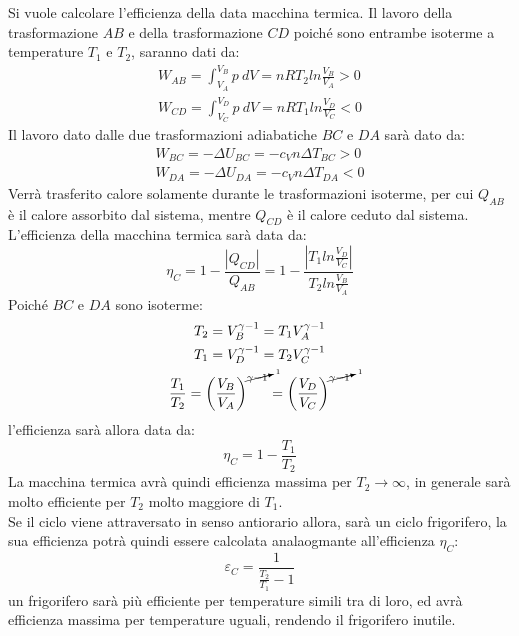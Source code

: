\documentclass{article}
\numberwithin{equation}{subsection}
\begin{document}
Si vuole calcolare l'efficienza della data macchina termica. Il 
lavoro della trasformazione $AB$ e della trasformazione $CD$ poiché sono 
entrambe isoterme a temperature $T_1$ e $T_2$, saranno dati da: 
\begin{gather}
    W_{AB}=\int_{V_A}^{V_B}p\:dV=nRT_2ln\displaystyle\frac{V_B}{V_A}>0\\
    W_{CD}=\int_{V_C}^{V_D}p\:dV=nRT_1ln\displaystyle\frac{V_D}{V_C}<0
\end{gather}
Il lavoro dato dalle due trasformazioni adiabatiche $BC$ e $DA$ sarà dato da:
\begin{gather}
    W_{BC}=-\Delta U_{BC}=-c_Vn\Delta T_{BC}>0\\
    W_{DA}=-\Delta U_{DA}=-c_Vn\Delta T_{DA}<0
\end{gather}
Verrà trasferito calore solamente durante le trasformazioni isoterme, per cui 
$Q_{AB}$ è il calore assorbito dal sistema, mentre $Q_{CD}$ è il calore 
ceduto dal sistema. \\
L'efficienza della macchina termica sarà data da:
\begin{equation}
    \eta_C=1-\displaystyle\frac{|Q_{CD}|}{Q_{AB}}=1-\frac{\left|T_1ln\displaystyle\frac{V_D}{V_C}\right|}{T_2ln\displaystyle\frac{V_B}{V_A}}
\end{equation}
Poiché $BC$ e $DA$ sono isoterme:
\begin{gather}
    T_2=V_B^{\gamma-1}=T_1V_A^{\gamma-1}\\
    T_1=V_D^{\gamma-1}=T_2V_C^{\gamma-1}\\
    \displaystyle\frac{T_1}{T_2}=\left(\frac{V_B}{V_A}\right)^{\cancelto{1}{\gamma-1}}=\left(\frac{V_D}{V_C}\right)^{\cancelto{1}{\gamma-1}}
\end{gather}
l'efficienza sarà allora data da:
\begin{equation}
    \eta_C=1-\displaystyle\frac{T_1}{T_2}
\end{equation}
La macchina termica avrà quindi efficienza massima per $T_2\to\infty$, 
in generale sarà molto efficiente per $T_2$ molto maggiore di $T_1$.\\
Se il ciclo viene attraversato in senso antiorario allora, sarà un ciclo 
frigorifero, la sua efficienza potrà quindi essere calcolata 
analaogmante all'efficienza $\eta_C$:
\begin{equation}
    \varepsilon_C=\displaystyle\frac{1}{\displaystyle\frac{T_2}{T_1}-1}
\end{equation}
un frigorifero sarà più efficiente per temperature simili tra di loro, 
ed avrà efficienza massima per temperature uguali, rendendo il frigorifero 
inutile. 
\end{document}
